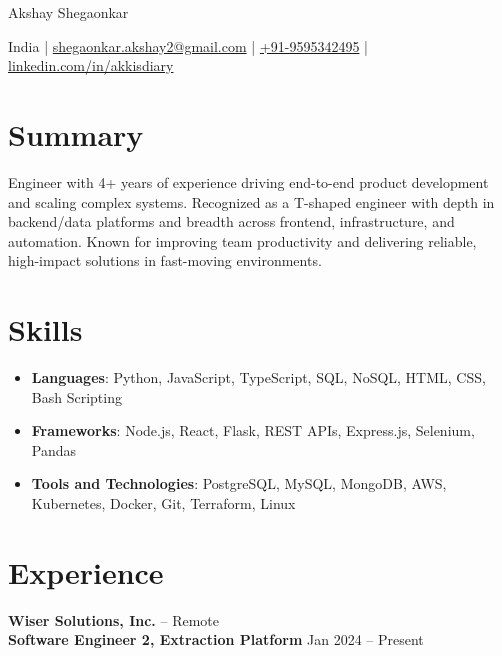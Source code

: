 \documentclass[11pt]{article}       %
\begin{document}
\centerline{\Huge Akshay Shegaonkar}
\vspace{4pt}
\centerline{
  India | \href{mailto:shegaonkar.akshay2@gmail.com}{shegaonkar.akshay2@gmail.com} | \href{tel:+919595342495}{+91-9595342495} | \href{https://www.linkedin.com/in/akkisdiary}{linkedin.com/in/akkisdiary}
}

\section*{Summary}

Engineer with 4+ years of experience driving end-to-end product development and scaling complex systems. Recognized as a T-shaped engineer with depth in backend/data platforms and breadth across frontend, infrastructure, and automation. Known for improving team productivity and delivering reliable, high-impact solutions in fast-moving environments. \\

\section*{Skills}

\begin{itemize}
  \item \textbf{Languages}: Python, JavaScript, TypeScript, SQL, NoSQL, HTML, CSS, Bash Scripting \\
  \item \textbf{Frameworks}: Node.js, React, Flask, REST APIs, Express.js, Selenium, Pandas \\
  \item \textbf{Tools and Technologies}: PostgreSQL, MySQL, MongoDB, AWS, Kubernetes, Docker, Git, Terraform, Linux \\
\end{itemize}

\section*{Experience}

\textbf{Wiser Solutions, Inc.} -- Remote \\

\textbf{Software Engineer 2, Extraction Platform} \hfill Jan 2024 -- Present \\
\end{document}

